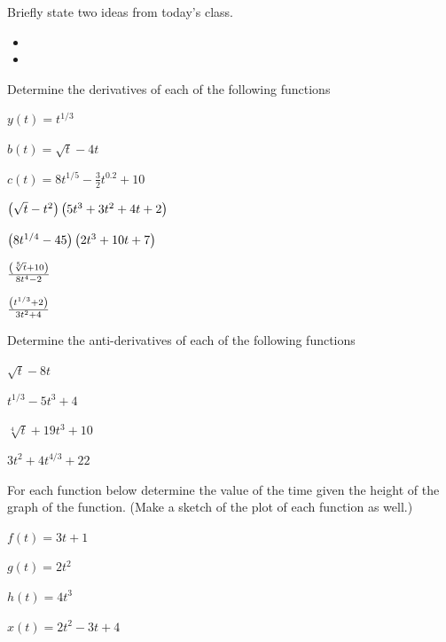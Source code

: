\begin{problem}
\item Briefly state two ideas from today's class.
  \begin{itemize}
  \item
  \item
  \end{itemize}
\item Determine the derivatives of each of the following functions
  \begin{subproblem}
    \item $y(t)=t^{1/3}$
      \vfill
    \item $b(t)=\sqrt{t} - 4t$
      \vfill
    \item $c(t) = 8 t^{1/5} - \frac{3}{2} t^{0.2} + 10$
      \vfill
    \item $\left( \sqrt{t} - t^2 \right) \left( 5 t^3 + 3 t^2 + 4t +2 \right)$
      \vfill
    \item $\left( 8 t^{1/4} - 45 \right) \left( 2 t^3 + 10 t + 7 \right)$
      \vfill
    \item $\frac{\left( \sqrt[5]{t}+10 \right)}{8t^4-2}$
      \vfill
    \item $\frac{\left( t^{1/3}+2 \right)}{3t^2+4}$
      \vfill
  \end{subproblem}
  \clearpage
\item Determine the anti-derivatives of each of the following functions
  \begin{subproblem}
    \item $\sqrt{t} - 8t$
      \vfill
    \item $t^{1/3} - 5 t^3 + 4$
      \vfill
    \item $\sqrt[4]{t} + 19 t^3 + 10$
      \vfill
    \item $3 t^2 + 4 t^{4/3} + 22$
      \vfill
  \end{subproblem}
  \clearpage
  \clearpage

\item For each function below determine the value of the time given
  the height of the graph of the function. (Make a sketch of the plot
  of each function as well.)

  \begin{subproblem}
  \item $f(t)=3t+1$
    \vfill
  \item $g(t)=2t^2$
    \vfill
  \item $h(t)=4t^3$
    \vfill
  \item $x(t)=2t^2 - 3t + 4$
    \vfill
  \end{subproblem}


  \vfill

\end{problem}



